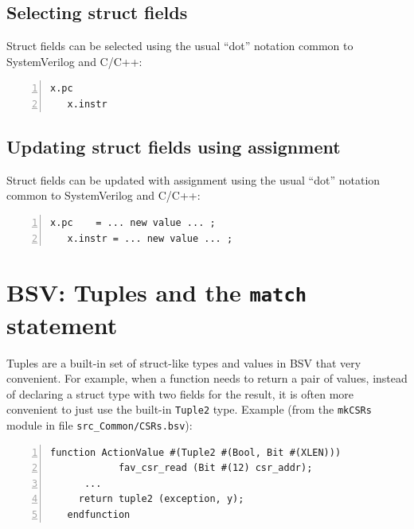 \subsection{Selecting struct fields}


Struct fields can be selected using the usual ``dot'' notation common
to SystemVerilog and C/C++:

{\footnotesize
\begin{Verbatim}[frame=single, numbers=left]
   x.pc
   x.instr
\end{Verbatim}
}



\subsection{Updating struct fields using assignment}


Struct fields can be updated with assignment using the usual ``dot''
notation common to SystemVerilog and C/C++:

{\footnotesize
\begin{Verbatim}[frame=single, numbers=left]
   x.pc    = ... new value ... ;
   x.instr = ... new value ... ;
\end{Verbatim}
}


\section{BSV: Tuples and the {\tt match} statement}

\label{Sec_Tuples}


Tuples are a built-in set of struct-like types and values in BSV that
very convenient.  For example, when a function needs to return a pair
of values, instead of declaring a struct type with two fields for the
result, it is often more convenient to just use the built-in
\verb|Tuple2| type.  Example (from the \verb|mkCSRs| module in file
\verb|src_Common/CSRs.bsv|):

{\footnotesize
\begin{Verbatim}[frame=single, numbers=left]
   function ActionValue #(Tuple2 #(Bool, Bit #(XLEN)))
            fav_csr_read (Bit #(12) csr_addr);
      ...
	 return tuple2 (exception, y);
   endfunction
\end{Verbatim}
}

